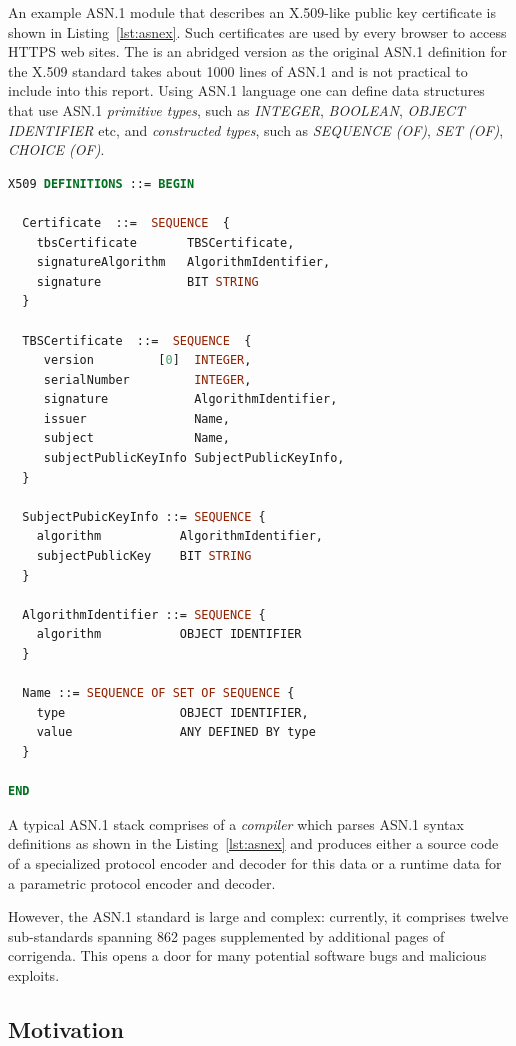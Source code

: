 \documentclass[acmsmall,nonacm]{acmart}
\begin{document}
An example ASN.1 module that describes an X.509-like public key
certificate is shown in Listing~\ref{lst:asnex}. Such certificates are
used by every browser to access HTTPS web sites. The is an abridged
version as the original ASN.1 definition for the X.509 standard takes
about 1000 lines of ASN.1 and is not practical to include into this
report. Using ASN.1 language one can define data structures that use
ASN.1 {\it primitive types}, such as \emph{INTEGER}, \emph{BOOLEAN}, \emph{OBJECT
IDENTIFIER} etc, and {\it constructed types}, such as \emph{SEQUENCE (OF)},
\emph{SET (OF)}, \emph{CHOICE (OF)}.

\begin{lstlisting}[language=ASN1,label=lst:asnex,
  caption={ASN.1 example of X.509 certificates, adapted for brevity}]
X509 DEFINITIONS ::= BEGIN

  Certificate  ::=  SEQUENCE  {
    tbsCertificate       TBSCertificate,
    signatureAlgorithm   AlgorithmIdentifier,
    signature            BIT STRING
  }

  TBSCertificate  ::=  SEQUENCE  {
     version         [0]  INTEGER,
     serialNumber         INTEGER,
     signature            AlgorithmIdentifier,
     issuer               Name,
     subject              Name,
     subjectPublicKeyInfo SubjectPublicKeyInfo,
  }

  SubjectPubicKeyInfo ::= SEQUENCE {
    algorithm           AlgorithmIdentifier,
    subjectPublicKey    BIT STRING
  }

  AlgorithmIdentifier ::= SEQUENCE {
    algorithm           OBJECT IDENTIFIER
  }

  Name ::= SEQUENCE OF SET OF SEQUENCE {
    type                OBJECT IDENTIFIER,
    value               ANY DEFINED BY type
  }

END
\end{lstlisting}


A typical ASN.1 stack comprises of a \textit{compiler} which parses
ASN.1 syntax definitions as shown in the Listing~\ref{lst:asnex} and
produces either a source code of a specialized protocol encoder and
decoder for this data or a runtime data for a parametric protocol
encoder and decoder.

However, the ASN.1 standard \cite{ASN1Intro} is large and complex:
currently, it comprises twelve sub-standards spanning 862 pages
supplemented by additional pages of corrigenda\cite{ASN1Intro}. This opens
a door for many potential software bugs and malicious exploits.
  
\subsection{Motivation}
\end{document}
